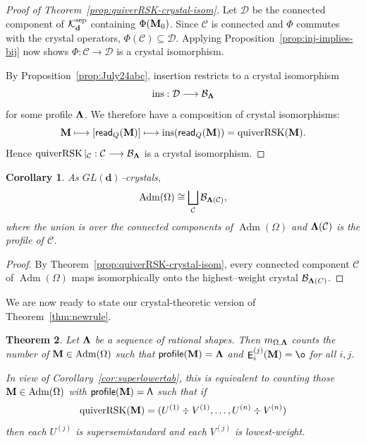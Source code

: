 \documentclass[12pt]{amsart}
\renewcommand{\d}{\mathbf{d}}
\DeclareMathOperator{\Std}{\operatorname{Adm}}
\DeclareMathOperator{\mate}{\sf E}
\newtheorem{theorem}{Theorem}[section]
\newtheorem{corollary}[theorem]{Corollary}
\theoremstyle{definition}
\theoremstyle{remark}
\begin{document}
\begin{proof}[Proof of Theorem~\ref{prop:quiverRSK-crystal-isom}]
Let ${\mathcal D}$ be the connected component of
${\mathcal K}_{\bf d}^{\operatorname{sep}}$ containing
$\Phi({\bf M}_0)$. Since ${\mathcal C}$ is connected and $\Phi$
commutes with the crystal operators,
$\Phi({\mathcal C})\subseteq{\mathcal D}$.
Applying Proposition~\ref{prop:inj-implies-bij} now shows
$\Phi:{\mathcal C}\longrightarrow{\mathcal D}$
is a crystal isomorphism.

By Proposition~\ref{prop:July24abc}, insertion restricts to a
crystal isomorphism
\[
\operatorname{ins}:{\mathcal D}\longrightarrow{\mathcal B}_{\bf\Lambda}
\]
for some profile ${\bf\Lambda}$. We therefore have a composition of crystal isomorphisms:
\[
{\bf M}\longmapsto
[{\sf read}_Q({\bf M})]
\longmapsto
\operatorname{ins}({\sf read}_Q({\bf M}))
=
\operatorname{quiverRSK}({\bf M}).
\]
Hence $\operatorname{quiverRSK}|_{\mathcal C}:
{\mathcal C}\longrightarrow{\mathcal B}_{\bf\Lambda}$
is a crystal isomorphism.
\end{proof}


\begin{corollary} \label{cor:crystal-decomp-quiver-locus}
As $GL(\d)$--crystals,
\[\Std(\Omega) \cong \bigsqcup_{\mathcal{C}} \mathcal{B}_{{\bf \Lambda}(\mathcal{C})},\]
where the union is over the connected components of $\Std(\Omega)$ and ${\bf \Lambda}(\mathcal{C})$ is the profile of $\mathcal{C}$.
\end{corollary}

\begin{proof}
By Theorem~\ref{prop:quiverRSK-crystal-isom}, every connected component $\mathcal{C}$ of $\Std(\Omega)$ maps isomorphically onto the highest--weight crystal $\mathcal{B}_{{\bf \Lambda}(C)}$.
\end{proof}

We are now ready to state our crystal-theoretic version of Theorem~\ref{thm:newrule}.

\begin{theorem}\label{thm:mainprecise}
Let ${\bf \Lambda}$ be a sequence of rational shapes. Then
$m_{\Omega,{\bf \Lambda}}$ counts the number of ${\bf M}\in \Std(\Omega)$ such that
${\sf profile}({\bf M})={\bf \Lambda}$ and $\mate_i^{(j)}({\bf M})=\o$ for all $i,j$.

In view of Corollary~\ref{cor:superlowertab}, this is equivalent to counting those ${\bf M}\in \Std(\Omega)$ 
with $\sf{profile}({\bf M})=\Lambda$ such that if 
\[\operatorname{quiverRSK}({\bf M})=(U^{(1)}\div V^{(1)},\ldots,U^{(n)}\div V^{(n)})\]
then each $U^{(j)}$ is supersemistandard and each $V^{(j)}$ is lowest-weight.
\end{theorem}
\end{document}

